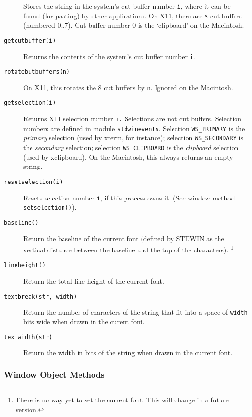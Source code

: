 \begin{description}
Stores the string in the system's cut buffer number
{\tt i},
where it can be found (for pasting) by other applications.
On X11, there are 8 cut buffers (numbered 0..7).
Cut buffer number 0 is the `clipboard' on the Macintosh.
\item[{\tt getcutbuffer(i)}]
Returns the contents of the system's cut buffer number
{\tt i}.
\item[{\tt rotatebutbuffers(n)}]
On X11, this rotates the 8 cut buffers by
{\tt n}.
Ignored on the Macintosh.
\item[{\tt getselection(i)}]
Returns X11 selection number
{\tt i.}
Selections are not cut buffers.
Selection numbers are defined in module
{\tt stdwinevents}.
Selection {\tt WS\_PRIMARY} is the
{\em primary}
selection (used by
xterm,
for instance);
selection {\tt WS\_SECONDARY} is the
{\em secondary}
selection; selection {\tt WS\_CLIPBOARD} is the
{\em clipboard}
selection (used by
xclipboard).
On the Macintosh, this always returns an empty string.
\item[{\tt resetselection(i)}]
Resets selection number
{\tt i},
if this process owns it.
(See window method
{\tt setselection()}).
\item[{\tt baseline()}]
Return the baseline of the current font (defined by STDWIN as the
vertical distance between the baseline and the top of the
characters).%
\footnote{
There is no way yet to set the current font.
This will change in a future version.
}
\item[{\tt lineheight()}]
Return the total line height of the current font.
\item[{\tt textbreak(str, width)}]
Return the number of characters of the string that fit into a space of
{\tt width}
bits wide when drawn in the curent font.
\item[{\tt textwidth(str)}]
Return the width in bits of the string when drawn in the current font.
\end{description}

\subsubsection{Window Object Methods}

